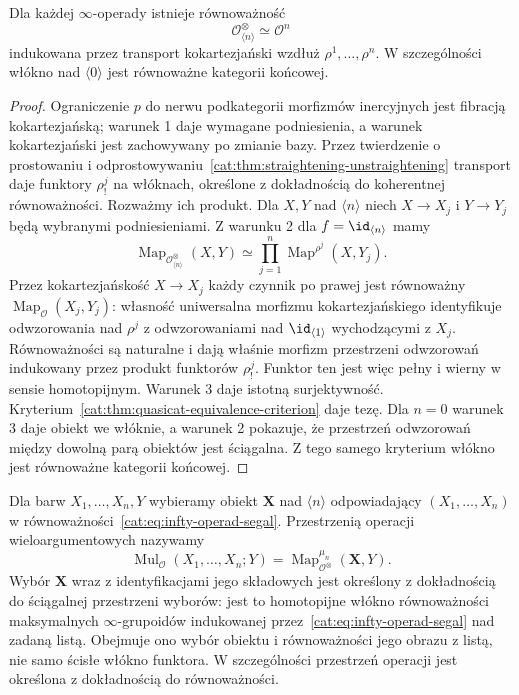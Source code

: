 \begin{stwierdzenie}\label{cat:prop:infty-operad-segal}
Dla każdej $\infty$-operady istnieje równoważność
\begin{equation}\label{cat:eq:infty-operad-segal}
 \mathcal O^\otimes_{\langle n\rangle}\simeq\mathcal O^n
\end{equation}
indukowana przez transport kokartezjański wzdłuż $\rho^1,\ldots,\rho^n$. W szczególności włókno nad $\langle0\rangle$ jest równoważne kategorii końcowej.
\end{stwierdzenie}
\begin{proof}
Ograniczenie $p$ do nerwu podkategorii morfizmów inercyjnych jest fibracją kokartezjańską; warunek 1 daje wymagane podniesienia, a warunek kokartezjański jest zachowywany po zmianie bazy. Przez twierdzenie o prostowaniu i odprostowywaniu~\ref{cat:thm:straightening-unstraightening} transport daje funktory $\rho^j_!$ na włóknach, określone z dokładnością do koherentnej równoważności. Rozważmy ich produkt. Dla $X,Y$ nad $\langle n\rangle$ niech $X\to X_j$ i $Y\to Y_j$ będą wybranymi podniesieniami. Z warunku 2 dla $f=\id_{\langle n\rangle}$ mamy
\[
 \operatorname{Map}_{\mathcal O^\otimes_{\langle n\rangle}}(X,Y)
 \simeq\prod_{j=1}^n\operatorname{Map}^{\rho^j}(X,Y_j).
\]
Przez kokartezjańskość $X\to X_j$ każdy czynnik po prawej jest równoważny $\operatorname{Map}_{\mathcal O}(X_j,Y_j)$: własność uniwersalna morfizmu kokartezjańskiego identyfikuje odwzorowania nad $\rho^j$ z odwzorowaniami nad $\id_{\langle1\rangle}$ wychodzącymi z $X_j$. Równoważności są naturalne i dają właśnie morfizm przestrzeni odwzorowań indukowany przez produkt funktorów $\rho^j_!$. Funktor ten jest więc pełny i wierny w sensie homotopijnym. Warunek 3 daje istotną surjektywność. Kryterium~\ref{cat:thm:quasicat-equivalence-criterion} daje tezę. Dla $n=0$ warunek 3 daje obiekt we włóknie, a warunek 2 pokazuje, że przestrzeń odwzorowań między dowolną parą obiektów jest ściągalna. Z tego samego kryterium włókno jest równoważne kategorii końcowej.
\end{proof}

\begin{definicja}\label{cat:def:infty-operad-multimap}
Dla barw $X_1,\ldots,X_n,Y$ wybieramy obiekt $\mathbf X$ nad $\langle n\rangle$ odpowiadający $(X_1,\ldots,X_n)$ w równoważności~\eqref{cat:eq:infty-operad-segal}. Przestrzenią operacji wieloargumentowych nazywamy
\[
 \operatorname{Mul}_{\mathcal O}(X_1,\ldots,X_n;Y)
 =\operatorname{Map}^{\mu_n}_{\mathcal O^\otimes}(\mathbf X,Y).
\]
Wybór $\mathbf X$ wraz z identyfikacjami jego składowych jest określony z dokładnością do ściągalnej przestrzeni wyborów: jest to homotopijne włókno równoważności maksymalnych $\infty$-grupoidów indukowanej przez~\eqref{cat:eq:infty-operad-segal} nad zadaną listą. Obejmuje ono wybór obiektu i równoważności jego obrazu z listą, nie samo ścisłe włókno funktora. W szczególności przestrzeń operacji jest określona z dokładnością do równoważności.
\end{definicja}

